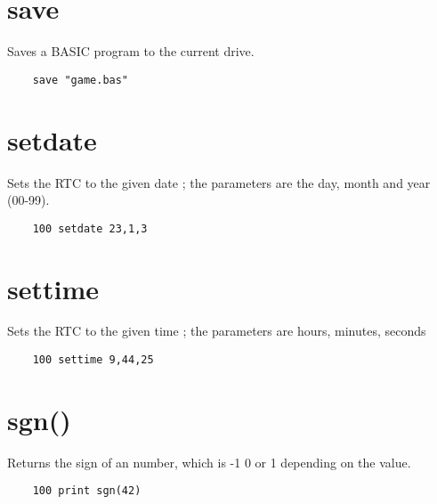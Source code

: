 \section*{save}
Saves a BASIC program to the current drive.
\example{}
\begin{verbatim}
	save "game.bas"
\end{verbatim}

\section*{setdate}
Sets the RTC to the given date ; the parameters are the day, month and year (00-99). 
\example{}
\begin{verbatim}
	100 setdate 23,1,3
\end{verbatim}

\section*{settime}
Sets the RTC to the given time ; the parameters are hours, minutes, seconds
\example{}
\begin{verbatim}
	100 settime 9,44,25
\end{verbatim}

\section*{sgn()}
Returns the sign of an number, which is -1 0 or 1 depending on the value.
\example{}
\begin{verbatim}
	100 print sgn(42)
\end{verbatim}

